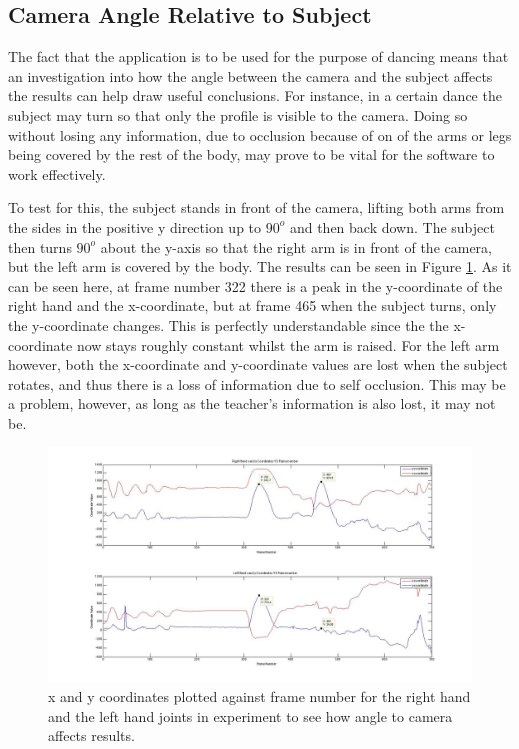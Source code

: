 \documentclass[11pt,a4paper]{article}
\begin{document}
\subsection{Camera Angle Relative to Subject}
\noindent 
The fact that the application is to be used for the purpose of dancing means that an investigation into how the angle between the camera and the subject affects the results can help draw useful conclusions. For instance, in a certain dance the subject may turn so that only the profile is visible to the camera. Doing so without losing any information, due to occlusion because of on of the arms or legs being covered by the rest of the body, may prove to be vital for the software to work effectively. 
 
\noindent
To test for this, the subject stands in front of the camera, lifting both arms from the sides in the positive y direction up to $90^o$ and then back down. The subject then turns $90^o$ about the y-axis so that the right arm is in front of the camera, but the left arm is covered by the body. The results can be seen in Figure \ref{angle_camera}. As it can be seen here, at frame number 322 there is a peak in the y-coordinate of the right hand and the x-coordinate, but at frame 465 when the subject turns, only the y-coordinate changes. This is perfectly understandable since the the x-coordinate now stays roughly constant whilst the arm is raised. For the left arm however, both the x-coordinate and y-coordinate values are lost when the subject rotates, and thus there is a loss of information due to self occlusion. This may be a problem, however, as long as the teacher's information is also lost, it may not be.  
\begin{figure}[H]
\centering
\includegraphics[scale=0.2]{Angle_To_Camera.jpg}
\caption{x and y coordinates plotted against frame number for the right hand and the left hand joints in experiment to see how angle to camera affects results.}
\label{angle_camera}
\end{figure}
\end{document}
